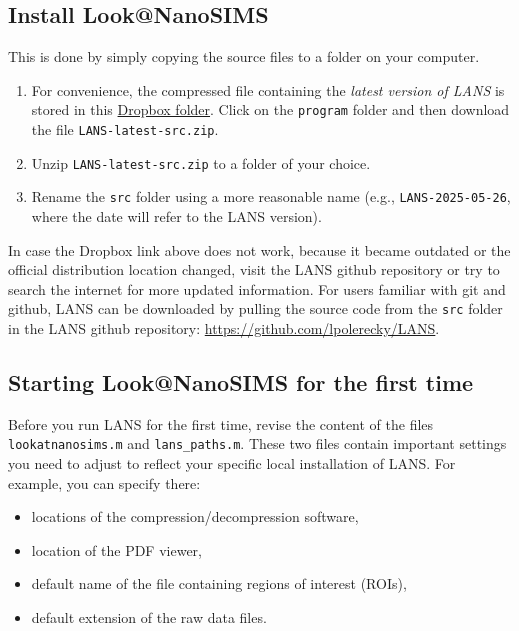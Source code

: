 \documentclass[a4paper, 11pt]{article}
\newcommand{\ttt}[1]{\texttt{#1}}
\newcommand\mnote{\marginnote{\fbox{\textbf{\bf Note}}}}
\begin{document}
\subsection{Install Look@NanoSIMS}

This is done by simply copying the source files to a folder on your computer.

\begin{enumerate}
 
\item For convenience, the compressed file containing the \emph{latest version of LANS} is stored in this \href{https://www.dropbox.com/sh/gyss2uvv5ggu2vl/AABViAmt9WHryEP_xZBrCG_La?dl=0}{Dropbox folder}. Click on the \ttt{program} folder and then download the file \ttt{LANS-latest-src.zip}.

\item Unzip \ttt{LANS-latest-src.zip} to a folder of your choice.

\item Rename the \ttt{src} folder using a more reasonable name (e.g., \ttt{LANS-2025-05-26}, where the date will refer to the LANS version).

\end{enumerate}

\mnote
In case the Dropbox link above does not work, because it became outdated or the official distribution location changed, visit the LANS github repository or try to search the internet for more updated information. For users familiar with git and github, LANS can be downloaded by pulling the source code from the \ttt{src} folder in the LANS github repository: \url{https://github.com/lpolerecky/LANS}.


\subsection{Starting Look@NanoSIMS for the first time}

Before you run LANS for the first time, revise the content of the files \ttt{lookatnanosims.m} and \ttt{lans\_paths.m}. These two files contain important settings you need to adjust to reflect your specific local installation of LANS. For example, you can specify there:

\begin{itemize}
\item locations of the compression/decompression software,
\item location of the PDF viewer,
\item default name of the file containing regions of interest (ROIs),
\item default extension of the raw data files.
\end{itemize}
\end{document}

